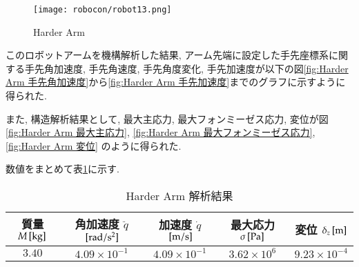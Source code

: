 \documentclass[10pt,b5paper,papersize,dvipdfmx]{jsbook}
\begin{document}
\begin{figure}[H]
  \centering
  \texttt{[image: robocon/robot13.png]}
  \caption{Harder Arm}
  \label{fig:Harder Arm}
\end{figure}
このロボットアームを機構解析した結果, アーム先端に設定した手先座標系に関する手先角加速度, 手先角速度, 手先角度変化, 手先加速度が以下の図\ref{fig:Harder Arm 手先角加速度}から\ref{fig:Harder Arm 手先加速度}までのグラフに示すように得られた. \par
また, 構造解析結果として, 最大主応力, 最大フォンミーゼス応力, 変位が図\ref{fig:Harder Arm 最大主応力}, \ref{fig:Harder Arm 最大フォンミーゼス応力}, \ref{fig:Harder Arm 変位} のように得られた.\par 
数値をまとめて表\ref{tbl:Harder Arm 解析結果}に示す.
\begin{table}[H]
  \centering
  \caption{Harder Arm 解析結果}
  \label{tbl:Harder Arm 解析結果}
  \begin{tabular}{|c|c|c|c|c|} \hline
    質量 $M\tani*{kg}$ & 角加速度 $\ddot{q} $$\tani*{rad/s^2}$ & 加速度 $\dot{q}$$\tani*{m/s}$ & 最大応力 $\sigma\tani*{Pa}$ & 変位 $\delta_z\tani*{m}$ \\ \hline
    $3.40$ & $4.09\times 10^{-1}$ & $4.09\times 10^{-1}$ & $3.62\times 10^6$ & $9.23\times 10^{-4}$ \\ \hline
  \end{tabular}
\end{table}
\end{document}
